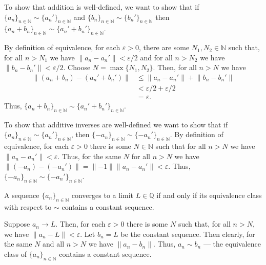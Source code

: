 \documentclass[12 pt, letterpaper]{hmcpset}
\begin{document}
\begin{solution}
	To show that addition is well-defined, we want to show that if  $\{ a_{n} \}_{n \in \mathbb{N}} \sim \{ a_{n}' \}_{n \in \mathbb{N}}$ and $\{ b_{n} \}_{n \in \mathbb{N}} \sim \{ b_{n}' \}_{n \in \mathbb{N}}$ then $\{ a_{n} + b_{n} \}_{n \in \mathbb{N}} \sim \{ a_{n}' + b_{n}' \}_{n \in \mathbb{N}}$.

	By definition of equivalence, for each $\varepsilon > 0$, there are some $N_{1}, N_{2} \in \mathbb{N}$ such that, for all $n > N_{1}$ we have $\lVert a_{n} - a_{n}' \rVert < \varepsilon / 2$ and for all $n > N_{2}$ we have $\lVert b_{n} - b_{n}' \rVert < \varepsilon/2$. Choose $N = \max \{ N_{1}, N_{2} \}$. Then, for all $n > N$ we have
	\begin{align*}
		\lVert (a_{n} + b_{n}) - (a_{n}' + b_{n}') \rVert & \le \lVert a_{n} - a_{n}' \rVert + \lVert b_{n} - b_{n}' \rVert \\
								  & < \varepsilon/2 + \varepsilon/2 \\
								  & = \varepsilon.
	\end{align*}
	Thus, $\{ a_{n} + b_{n} \}_{n \in \mathbb{N}} \sim \{ a_{n}' + b_{n}' \}_{n \in \mathbb{N}}$.

	To show that additive inverses are well-defined we want to show that if $\{ a_{n} \}_{n \in \mathbb{N}} \sim \{ a_{n}' \}_{n \in \mathbb{N}}$, then $\{ -a_{n} \}_{n \in \mathbb{N}} \sim \{ -a_{n}' \}_{n \in \mathbb{N}}$. By definition of equivalence, for each $\varepsilon > 0$ there is some $N \in \mathbb{N}$ such that for all $n > N$ we have $\lVert a_{n} - a_{n}' \rVert < \varepsilon$. Thus, for the same $N$ for all $n > N$ we have $\lVert (-a_{n}) - (-a_{n}') \rVert = \lVert -1 \rVert \lVert a_{n} - a_{n}' \rVert < \varepsilon$. Thus, $\{ -a_{n} \}_{n \in \mathbb{N}} \sim \{ -a_{n}' \}_{n \in \mathbb{N}}$.
\end{solution}

\pagebreak

\begin{problem}[(7)]
	A sequence $\{ a_{n} \}_{n \in \mathbb{N}}$ converges to a limit $L \in \mathbb{Q}$ if and only if its equivalence class with respect to $\sim$ contains a constant sequence.
\end{problem}

\begin{solution}
	Suppose $a_{n} \to L$. Then, for each $\varepsilon > 0$ there is some $N$ such that, for all $n > N$, we have $\lVert a_{n} - L \rVert < \varepsilon$. Let $b_{n} = L$ be the constant sequence. Then clearly, for the same $N$ and all $n > N$ we have $\lVert a_{n} - b_{n} \rVert$. Thus, $a_{n} \sim b_{n}$ --- the equivalence class of $\{ a_{n} \}_{n \in \mathbb{N}}$ contains a constant sequence.
\end{solution}
\end{document}
